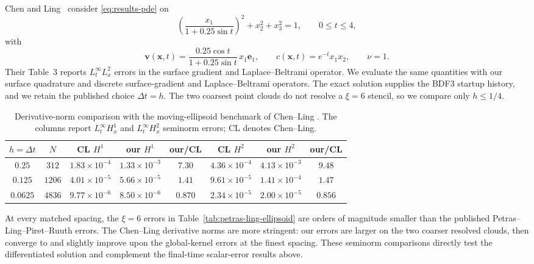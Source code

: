 \documentclass[a4paper,fleqn]{cas-sc}
\begin{document}
Chen and Ling~\cite{ChenLing2020KernelHeatTransport} consider
\eqref{eq:results-pde} on
\[
  \left(\frac{x_1}{1+0.25\sin t}\right)^2+x_2^2+x_3^2=1,
  \qquad 0\le t\le4,
\]
with
\[
  \bm v(\bm x,t)
  =
  \frac{0.25\cos t}{1+0.25\sin t}\,x_1\bm e_1,
  \qquad
  c(\bm x,t)=e^{-t}x_1x_2,
  \qquad \nu=1.
\]
Their Table~3 reports \(L^\infty_tL^2_x\) errors in the surface gradient
and Laplace--Beltrami operator.  We evaluate the same quantities with our
surface quadrature and discrete surface-gradient and Laplace--Beltrami
operators.  The exact solution supplies the BDF3 startup history, and we retain
the published choice \(\Delta t=h\).  The two coarsest point clouds do not
resolve a \(\xi=6\) stencil, so we compare only \(h\le1/4\).

\begin{table}[t]
\centering
\caption{Derivative-norm comparison with the moving-ellipsoid benchmark of
Chen--Ling \cite{ChenLing2020KernelHeatTransport}.  The columns report
\(L^\infty_tH^1_x\) and \(L^\infty_tH^2_x\) seminorm errors; CL denotes
Chen--Ling.}
\scriptsize
\setlength{\tabcolsep}{3pt}
\label{tab:chen-ling-ellipsoid}
\begin{tabular}{c c c c c c c c}
\toprule
\(h=\Delta t\) & \(N\) & CL \(H^1\) & our \(H^1\) &
our/CL & CL \(H^2\) & our \(H^2\) & our/CL \\
\midrule
\(0.25\) & \(312\) &
\(1.83{\times}10^{-4}\) & \(1.33{\times}10^{-3}\) & \(7.30\) &
\(4.36{\times}10^{-4}\) & \(4.13{\times}10^{-3}\) & \(9.48\) \\
\(0.125\) & \(1206\) &
\(4.01{\times}10^{-5}\) & \(5.66{\times}10^{-5}\) & \(1.41\) &
\(9.61{\times}10^{-5}\) & \(1.41{\times}10^{-4}\) & \(1.47\) \\
\(0.0625\) & \(4836\) &
\(9.77{\times}10^{-6}\) & \(8.50{\times}10^{-6}\) & \(0.870\) &
\(2.34{\times}10^{-5}\) & \(2.00{\times}10^{-5}\) & \(0.856\) \\
\bottomrule
\end{tabular}
\end{table}

At every matched spacing, the \(\xi=6\) errors in
Table~\ref{tab:petras-ling-ellipsoid} are orders of magnitude smaller than the
published Petras--Ling--Piret--Ruuth errors.  The Chen--Ling derivative norms
are more stringent: our errors are larger on the two coarser resolved clouds,
then converge to and slightly improve upon the global-kernel errors at the
finest spacing.  These seminorm comparisons directly test the differentiated
solution and complement the final-time scalar-error results above.
\end{document}
